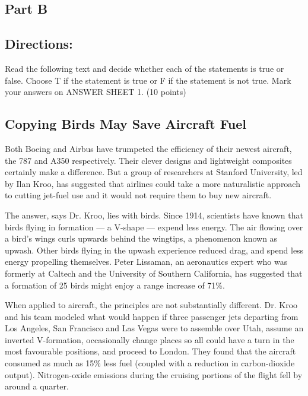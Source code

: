 \documentclass[UTF8,11pt]{ctexart}
\begin{document}
\subsection*{\textbf{Part B}}


\subsection*{\textbf{Directions:}}


Read the following text and decide whether each of the statements is true or false. Choose T if the statement is true or F if the statement is not true. Mark your answers on ANSWER SHEET 1. (10 points)


\subsection*{\textbf{Copying Birds May Save Aircraft Fuel}}


Both Boeing and Airbus have trumpeted the efficiency of their newest aircraft, the 787 and A350 respectively. Their clever designs and lightweight composites certainly make a difference. But a group of researchers at Stanford University, led by Ilan Kroo, has suggested that airlines could take a more naturalistic approach to cutting jet-fuel use and it would not require them to buy new aircraft.


The answer, says Dr. Kroo, lies with birds. Since 1914, scientists have known that birds flying in formation — a V-shape — expend less energy. The air flowing over a bird’s wings curls upwards behind the wingtips, a phenomenon known as upwash. Other birds flying in the upwash experience reduced drag, and spend less energy propelling themselves. Peter Lissaman, an aeronautics expert who was formerly at Caltech and the University of Southern California, has suggested that a formation of 25 birds might enjoy a range increase of 71\%.


When applied to aircraft, the principles are not substantially different. Dr. Kroo and his team modeled what would happen if three passenger jets departing from Los Angeles, San Francisco and Las Vegas were to assemble over Utah, assume an inverted V-formation, occasionally change places so all could have a turn in the most favourable positions, and proceed to London. They found that the aircraft consumed as much as 15\% less fuel (coupled with a reduction in carbon-dioxide output). Nitrogen-oxide emissions during the cruising portions of the flight fell by around a quarter.
\end{document}
